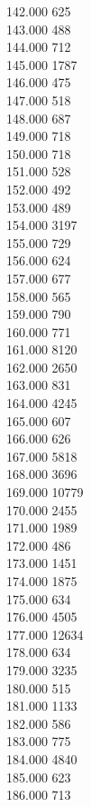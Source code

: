 { 142.000	625 \\
 143.000	488 \\
 144.000	712 \\
 145.000	1787 \\
 146.000	475 \\
 147.000	518 \\
 148.000	687 \\
 149.000	718 \\
 150.000	718 \\
 151.000	528 \\
 152.000	492 \\
 153.000	489 \\
 154.000	3197 \\
 155.000	729 \\
 156.000	624 \\
 157.000	677 \\
 158.000	565 \\
 159.000	790 \\
 160.000	771 \\
 161.000	8120 \\
 162.000	2650 \\
 163.000	831 \\
 164.000	4245 \\
 165.000	607 \\
 166.000	626 \\
 167.000	5818 \\
 168.000	3696 \\
 169.000	10779 \\
 170.000	2455 \\
 171.000	1989 \\
 172.000	486 \\
 173.000	1451 \\
 174.000	1875 \\
 175.000	634 \\
 176.000	4505 \\
 177.000	12634 \\
 178.000	634 \\
 179.000	3235 \\
 180.000	515 \\
 181.000	1133 \\
 182.000	586 \\
 183.000	775 \\
 184.000	4840 \\
 185.000	623 \\
 186.000	713 \\
}
